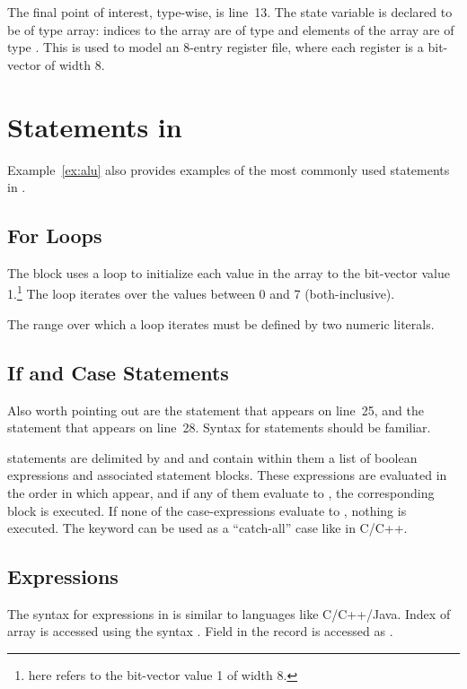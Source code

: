 The final point of interest, type-wise, is line~13. The state variable  is declared to be of type array: indices to the array are of type  and elements of the array are of type . This is used to model an 8-entry register file, where each register is a bit-vector of width 8.

\section{Statements in \uclid{}}

Example~\ref{ex:alu} also provides examples of the most commonly used statements in \uclid{}. 

\subsection{For Loops}
The  block uses a  loop to initialize each value in the array  to the bit-vector value 1.\footnote{ here refers to the bit-vector value 1 of width 8.} The loop iterates over the values between 0 and 7 (both-inclusive). 

The range over which a  loop iterates must be defined by two numeric literals.

\subsection{If and Case Statements}
Also worth pointing out are the  statement that appears on line~25, and the  statement that appears on line~28. Syntax for  statements should be familiar. 

 statements are delimited by  and  and contain within them a list of boolean expressions and associated statement blocks. These expressions are evaluated in the order in which appear, and if any of them evaluate to , the corresponding block is executed. If none of the case-expressions evaluate to , nothing is executed. The keyword  can be used as a ``catch-all'' case like in C/C++. 

\subsection{Expressions}

The syntax for expressions in \uclid{} is similar to languages like C/C++/Java. Index  of array  is accessed using the syntax . Field  in the record  is accessed as . 

